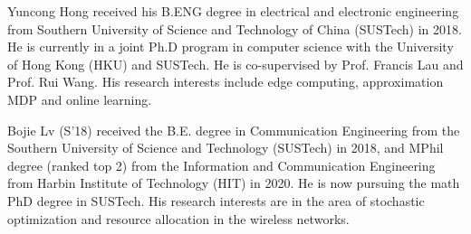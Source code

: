 
\vspace{-0.3cm}
\begin{IEEEbiography}{Yuncong Hong}
    received his B.ENG degree in electrical and electronic engineering from Southern University of Science and Technology of China (SUSTech) in 2018. He is currently in a joint Ph.D program in computer science with the University of Hong Kong (HKU) and SUSTech. He is co-supervised by Prof. Francis Lau and Prof. Rui Wang. His research interests include edge computing, approximation MDP and online learning.
\end{IEEEbiography}
\vspace{-1cm}

\begin{IEEEbiography}{Bojie Lv}
    (S'18) received the B.E. degree in Communication Engineering from the Southern University of Science and Technology (SUSTech) in 2018, and MPhil degree (ranked top 2) from the Information and Communication Engineering from Harbin Institute of Technology (HIT) in 2020. He is now pursuing the math PhD degree in SUSTech. His research interests are in the area of stochastic optimization and resource allocation in the wireless networks.
\end{IEEEbiography}
\vspace{-1cm}

